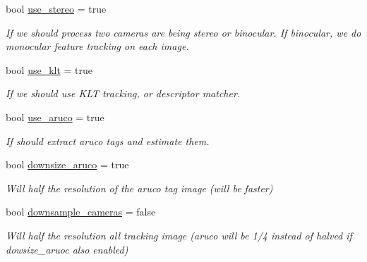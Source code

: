 \begin{DoxyCompactItemize}
bool \hyperlink{structov__msckf_1_1VioManagerOptions_af01535da59b1d2d5e3309aaa34e69c8e}{use\+\_\+stereo} = true
\begin{DoxyCompactList}\small\item\em If we should process two cameras are being stereo or binocular. If binocular, we do monocular feature tracking on each image. \end{DoxyCompactList}\item 
\mbox{\label{structov__msckf_1_1VioManagerOptions_a1885c647c47cb5216fc4b868553ec0fa}} 
bool \hyperlink{structov__msckf_1_1VioManagerOptions_a1885c647c47cb5216fc4b868553ec0fa}{use\+\_\+klt} = true
\begin{DoxyCompactList}\small\item\em If we should use K\+LT tracking, or descriptor matcher. \end{DoxyCompactList}\item 
\mbox{\label{structov__msckf_1_1VioManagerOptions_a731396cbfdf81f8519981d6e4b6374fd}} 
bool \hyperlink{structov__msckf_1_1VioManagerOptions_a731396cbfdf81f8519981d6e4b6374fd}{use\+\_\+aruco} = true
\begin{DoxyCompactList}\small\item\em If should extract aruco tags and estimate them. \end{DoxyCompactList}\item 
\mbox{\label{structov__msckf_1_1VioManagerOptions_afa1f6f0e1422dc41ea98c80077580c60}} 
bool \hyperlink{structov__msckf_1_1VioManagerOptions_afa1f6f0e1422dc41ea98c80077580c60}{downsize\+\_\+aruco} = true
\begin{DoxyCompactList}\small\item\em Will half the resolution of the aruco tag image (will be faster) \end{DoxyCompactList}\item 
\mbox{\label{structov__msckf_1_1VioManagerOptions_af08feea8c9e944e727483f6ff3899e8e}} 
bool \hyperlink{structov__msckf_1_1VioManagerOptions_af08feea8c9e944e727483f6ff3899e8e}{downsample\+\_\+cameras} = false
\begin{DoxyCompactList}\small\item\em Will half the resolution all tracking image (aruco will be 1/4 instead of halved if dowsize\+\_\+aruoc also enabled) \end{DoxyCompactList}\item 

\end{DoxyCompactItemize}
